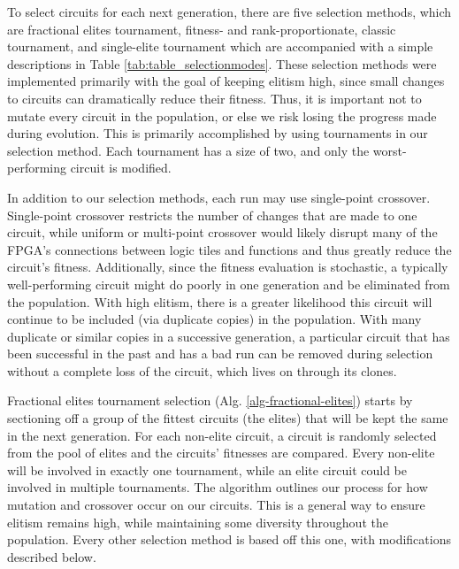\documentclass{ieeeaccess}
\begin{document}
To select circuits for each next generation, there are five selection methods, which are fractional elites tournament, fitness- and rank-proportionate, classic tournament, and single-elite tournament which are accompanied with a simple descriptions in Table \ref{tab:table_selectionmodes}. These selection methods were implemented primarily with the goal of keeping elitism high, since small changes to circuits can dramatically reduce their fitness. Thus, it is important not to mutate every circuit in the population, or else we risk losing the progress made during evolution. This is primarily accomplished by using tournaments in our selection method. Each tournament has a size of two, and only the worst-performing circuit is modified.


In addition to our selection methods, each run may use single-point crossover. Single-point crossover restricts the number of changes that are made to one circuit, while uniform or multi-point crossover would likely disrupt many of the FPGA’s connections between logic tiles and functions and thus greatly reduce the circuit's fitness. Additionally, since the fitness evaluation is stochastic, a typically well-performing circuit might do poorly in one generation and be eliminated from the population. With high elitism, there is a greater likelihood this circuit will continue to be included (via duplicate copies) in the population. With many duplicate or similar copies in a successive generation, a particular circuit that has been successful in the past and has a bad run can be removed during selection without a complete loss of the circuit, which lives on through its clones.



Fractional elites tournament selection (Alg. \ref{alg-fractional-elites}) starts by sectioning off a group of the fittest circuits (the elites) that will be kept the same in the next generation. For each non-elite circuit, a circuit is randomly selected from the pool of elites and the circuits' fitnesses are compared. Every non-elite will be involved in exactly one tournament, while an elite circuit could be involved in multiple tournaments. The algorithm outlines our process for how mutation and crossover occur on our circuits. This is a general way to ensure elitism remains high, while maintaining some diversity throughout the population. Every other selection method is based off this one, with modifications described below.
\end{document}
